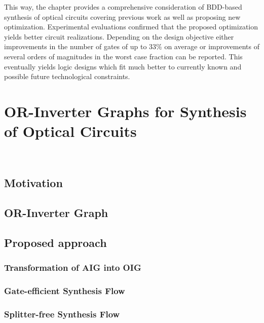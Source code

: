 \documentclass[10pt,letterpaper,twoside,openright]{book}
\begin{document}
This way, the chapter provides a comprehensive consideration of BDD-based synthesis of optical circuits covering previous work as well as proposing new optimization. Experimental evaluations confirmed that the proposed optimization yields better circuit realizations. Depending on the design objective either improvements in the number of gates of up to $33\%$ on average or improvements of several orders of magnitudes in the worst case fraction can be reported. This eventually yields logic designs which fit much better to currently known and possible future technological constraints.

\chapter{OR-Inverter Graphs for Synthesis of Optical Circuits}~\label{ch:oig-opt}

\section{Motivation}

\newpage

\section{OR-Inverter Graph}

\newpage

\section{Proposed approach}

\subsection{Transformation of AIG into OIG}

\newpage

\subsection{Gate-efficient Synthesis Flow}

\newpage

\subsection{Splitter-free Synthesis Flow}
\end{document}
